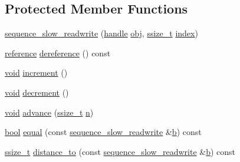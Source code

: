 \subsection*{Protected Member Functions}
\begin{DoxyCompactItemize}
\item 
\mbox{\hyperlink{classsequence__slow__readwrite_a955e2d54fdeeb18c53e268ca6d5aa04e}{sequence\+\_\+slow\+\_\+readwrite}} (\mbox{\hyperlink{classhandle}{handle}} \mbox{\hyperlink{_s_d_l__opengl__glext_8h_a0c0d4701a6c89f4f7f0640715d27ab26}{obj}}, \mbox{\hyperlink{detail_2common_8h_ac430d16fc097b3bf0a7469cfd09decda}{ssize\+\_\+t}} \mbox{\hyperlink{_s_d_l__opengl__glext_8h_a57f14e05b1900f16a2da82ade47d0c6d}{index}})
\item 
\mbox{\hyperlink{classsequence__slow__readwrite_ad59d36dc33d3bcff00de01c2d21ffe42}{reference}} \mbox{\hyperlink{classsequence__slow__readwrite_a6061367a92256c30a9b69e062f839682}{dereference}} () const
\item 
\mbox{\hyperlink{_s_d_l__opengles2__gl2ext_8h_ae5d8fa23ad07c48bb609509eae494c95}{void}} \mbox{\hyperlink{classsequence__slow__readwrite_a96167779622e78b49732210fd0c18855}{increment}} ()
\item 
\mbox{\hyperlink{_s_d_l__opengles2__gl2ext_8h_ae5d8fa23ad07c48bb609509eae494c95}{void}} \mbox{\hyperlink{classsequence__slow__readwrite_a14d280d9247d5b25b81486bb08cdf4a4}{decrement}} ()
\item 
\mbox{\hyperlink{_s_d_l__opengles2__gl2ext_8h_ae5d8fa23ad07c48bb609509eae494c95}{void}} \mbox{\hyperlink{classsequence__slow__readwrite_a8bef7e89f0ebfadca7cca71d688fb5cd}{advance}} (\mbox{\hyperlink{detail_2common_8h_ac430d16fc097b3bf0a7469cfd09decda}{ssize\+\_\+t}} \mbox{\hyperlink{_s_d_l__opengl__glext_8h_ae2b4646468bc89d0ba646f5cf838e051}{n}})
\item 
\mbox{\hyperlink{asdl_8h_af6a258d8f3ee5206d682d799316314b1}{bool}} \mbox{\hyperlink{classsequence__slow__readwrite_a7efc0f4d3cc74714cc043ef1d65c3ab7}{equal}} (const \mbox{\hyperlink{classsequence__slow__readwrite}{sequence\+\_\+slow\+\_\+readwrite}} \&\mbox{\hyperlink{_s_d_l__opengl__glext_8h_a0f71581a41fd2264c8944126dabbd010}{b}}) const
\item 
\mbox{\hyperlink{detail_2common_8h_ac430d16fc097b3bf0a7469cfd09decda}{ssize\+\_\+t}} \mbox{\hyperlink{classsequence__slow__readwrite_a971f935ea0b4db43994eb1adc4327ec4}{distance\+\_\+to}} (const \mbox{\hyperlink{classsequence__slow__readwrite}{sequence\+\_\+slow\+\_\+readwrite}} \&\mbox{\hyperlink{_s_d_l__opengl__glext_8h_a0f71581a41fd2264c8944126dabbd010}{b}}) const
\end{DoxyCompactItemize}


